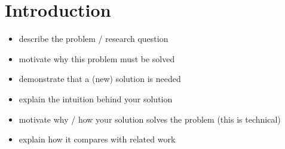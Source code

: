 \chapter{Introduction}\label{introduction}
\begin{itemize}
\item describe the problem / research question
\item motivate why this problem must be solved
\item demonstrate that a (new) solution is needed
\item explain the intuition behind your solution
\item motivate why / how your solution solves the problem (this is technical)
\item explain how it compares with related work
\end{itemize}
%
